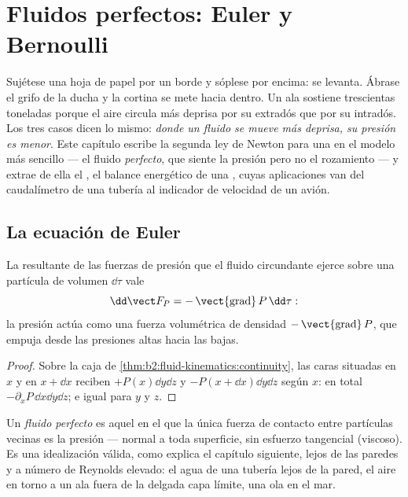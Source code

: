 \chapter{Fluidos perfectos: Euler y Bernoulli}\label{ch:b2:euler-bernoulli}

Sujétese una hoja de papel por un borde y sóplese por encima: se levanta.
Ábrase el grifo de la ducha y la cortina se mete hacia dentro. Un ala
sostiene trescientas toneladas porque el aire circula más deprisa por su
extradós que por su intradós. Los tres casos dicen lo mismo: \emph{donde
un fluido se mueve más deprisa, su presión es menor}. Este capítulo
escribe la segunda ley de Newton para una  en el modelo
más sencillo --- el fluido \emph{perfecto}, que siente la presión pero no
el rozamiento --- y extrae de ella el , el balance
energético de una , cuyas aplicaciones van del
caudalímetro de una tubería al indicador de velocidad de un avión.

\section{La ecuación de Euler}

\begin{proposition}\label{prop:b2:euler-bernoulli:pressure}
La resultante de las fuerzas de presión que el fluido circundante ejerce
sobre una partícula de volumen $\dd\tau$ vale
\[
\dd\vect F_P = -\operatorname{\vect{grad}}P\,\dd\tau :
\]
la presión actúa como una fuerza volumétrica de densidad $-\operatorname{\vect{grad}}P$,
que empuja desde las presiones altas hacia las bajas.
\end{proposition}

\begin{proof}
Sobre la caja de \cref{thm:b2:fluid-kinematics:continuity}, las caras
situadas en $x$ y en $x + \dd x$ reciben $+P(x)\dd y\dd z$ y $-P(x + \dd x)\dd y\dd z$
según $x$: en total $-\partial_xP\,\dd x\dd y\dd z$; e igual para $y$ y $z$.
\end{proof}

\begin{definition}\label{def:b2:euler-bernoulli:perfect}
Un \emph{fluido perfecto} es aquel en el que la única fuerza de contacto
entre partículas vecinas es la presión --- normal a toda superficie, sin
esfuerzo tangencial (viscoso). Es una idealización válida, como explica el
capítulo siguiente, lejos de las paredes y a número de Reynolds elevado:
el agua de una tubería lejos de la pared, el aire en torno a un ala fuera
de la delgada capa límite, una ola en el mar.
\end{definition}

